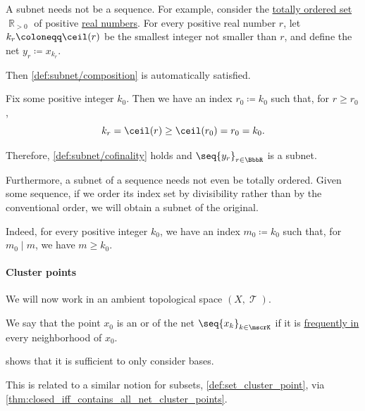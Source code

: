 \begin{example}
\begin{thmenum}
    A subnet needs not be a sequence. For example, consider the \hyperref[def:totally_ordered_set]{totally ordered set} \( \BbbR_{>0} \) of positive \hyperref[def:real_numbers]{real numbers}. For every positive real number \( r \), let \( k_r \coloneqq \ceil(r) \) be the smallest integer not smaller than \( r \), and define the net \( y_r \coloneqq x_{k_r} \).

    Then \ref{def:subnet/composition} is automatically satisfied.

    Fix some positive integer \( k_0 \). Then we have an index \( r_0 \coloneqq k_0 \) such that, for \( r \geq r_0 \),
    \begin{equation*}
      k_r = \ceil(r) \geq \ceil(r_0) = r_0 = k_0.
    \end{equation*}

    Therefore, \ref{def:subnet/cofinality} holds and \( \seq{ y_r }_{r \in \BbbR} \) is a subnet.

     Furthermore, a subnet of a sequence needs not even be totally ordered. Given some sequence, if we order its index set by divisibility rather than by the conventional order, we will obtain a subnet of the original.

    Indeed, for every positive integer \( k_0 \), we have an index \( m_0 \coloneqq k_0 \) such that, for \( m_0 \mid m \), we have \( m \geq k_0 \).
  \end{thmenum}
\end{example}

\paragraph{Cluster points}

We will now work in an ambient topological space \( (X, \mscrT) \).

\begin{definition}\label{def:net_cluster_point}
  We say that the point \( x_0 \) is an  or  of the net \( \seq{ x_k }_{k \in \mscrK} \) if it is \hyperref[def:net_frequently_in]{frequently in} every neighborhood of \( x_0 \).
\end{definition}
\begin{comments}
  \item {} shows that it is sufficient to only consider bases.
  \item This is related to a similar notion for subsets, \cref{def:set_cluster_point}, via \cref{thm:closed_iff_contains_all_net_cluster_points}.
\end{comments}

